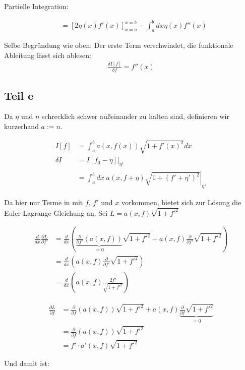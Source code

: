 \documentclass[a4paper,german,12pt,smallheadings]{scrartcl}
\begin{document}
Partielle Integration:

\begin{align*}
  &=\left[2\eta(x) f'(x)\right]_{x=a}^{x=b} - \int_a^b dx \eta(x) f''(x)
\end{align*}

Selbe Begründung wie oben: Der erste Term verschwindet, die funktionale Ableitung lässt sich ablesen:
\begin{align*}
  \frac{\delta I[f]}{\delta f} = f''(x)
\end{align*}

\subsection*{Teil e}
Da $\eta$ und $n$ schrecklich schwer außeinander zu halten sind,
definieren wir kurzerhand $a := n$.

\begin{align*}
  I[f] &= \int_a^b a(x,f(x)) \sqrt{1+f'(x)^2} dx \\
  \delta I &= \left.I[f_0 - \eta]\right|_{\eta^1} \\
  &=\left.\int_a^b dx \; a(x, f + \eta) \sqrt{1+(f'+\eta')^2} \right|_{\eta^1}
\end{align*}

Da hier nur Terme in mit $f$, $f'$ und $x$ vorkommen, bietet sich zur Lösung
die Euler-Lagrange-Gleichung an. Sei $L = a(x, f) \sqrt{1+f'^2}$

\begin{align*}
  \frac{d}{dx} \frac{\partial L}{\partial f'} &= \frac{d}{dx} \left(\underbrace{\frac{\partial}{\partial f'} (a(x, f))}_{=0} \sqrt{1+f'^2} + a(x,f) \frac{\partial}{\partial f'} \sqrt{1+f'^2} \right) \\
  &= \frac{d}{dx} \left(a(x,f) \frac{\partial}{\partial f'} \sqrt{1+f'^2} \right) \\
  &= \frac{d}{dx} \left(a(x,f) \frac{2f'}{\sqrt{1+f'^2}} \right)
\end{align*}

\begin{align*}
  \frac{\partial L}{\partial f} &= \frac{\partial}{\partial f} \left(a(x, f)\right) \sqrt{1+f'^2} + a(x, f) \underbrace{\frac{\partial}{\partial f} \sqrt{1+f'^2}}_{=0} \\
  &= \frac{\partial}{\partial f} \left(a(x, f)\right) \sqrt{1+f'^2} \\
  &= f' \cdot a'(x, f) \sqrt{1+f'^2}
\end{align*}

Und damit ist:
\end{document}
